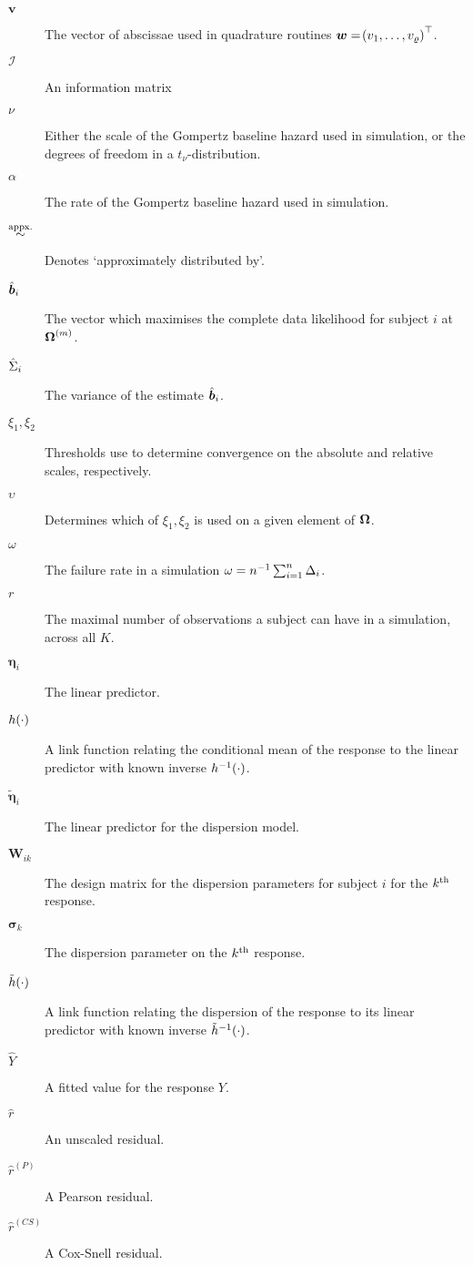 \begin{small}
\begin{multicols}{2}
\begin{description}
    \item[$\bm{v}$] The vector of abscissae used in quadrature routines $\bm{w}=\!\left( v_1,\dots,v_\varrho\right)^\top$.
    \item[$\mathcal{I}$] An information matrix
    \item[$\nu$] Either the scale of the Gompertz baseline hazard used in simulation, or the degrees of freedom in a $t_\nu$-distribution.
    \item[$\alpha$] The rate of the Gompertz baseline hazard used in simulation.
    \item[$\overset{\text{appx.}}{\sim}$] Denotes `approximately distributed by'.
    \item[$\hat{\bm{b}}_i$] The vector which maximises the complete data likelihood for subject $i$ at $\bm{\mathrm{\Omega}}^{(m)}$.
    \item[$\hat{\Sigma}_i$] The variance of the estimate $\hat{\bm{b}}_i$.
    \item[$\xi_1,\xi_2$] Thresholds use to determine convergence on the absolute and relative scales, respectively. 
    \item[$\upsilon$] Determines which of $\xi_1,\xi_2$ is used on a given element of $\bm{\mathrm{\Omega}}$. 
    \item[$\omega$] The failure rate in a simulation $\omega=n^{-1}\sum_{i=1}^n\Delta_i$. 
    \item[$r$] The maximal number of observations a subject can have in a simulation, across all $K$. 
    \item[$\bm{\eta}_i$] The linear predictor. 
    \item[$h\!\left(\cdot\right)$] A link function relating the conditional mean of the response to the linear predictor with known inverse $h^{-1}\!\left(\cdot\right)$. 
    \item[$\tilde{\bm{\eta}}_i$] The linear predictor for the dispersion model. 
    \item[$\bm{W}_{ik}$] The design matrix for the dispersion parameters for subject $i$ for the $k^{\text{th}}$ response. 
    \item[$\bm{\sigma}_k$] The dispersion parameter on the $k^{\text{th}}$ response. 
    \item[$\tilde{h}\!\left(\cdot\right)$] A link function relating the dispersion of the response to its linear predictor with known inverse $\tilde{h}^{-1}\!\left(\cdot\right)$. 
    \item[$\hat{Y}$] A fitted value for the response $Y$.
    \item[$\hat{r}$] An unscaled residual. 
    \item[$\hat{r}^{(P)}$] A Pearson residual. 
    \item[$\hat{r}^{(CS)}$] A Cox-Snell residual. 

\end{description}
\end{multicols}
\end{small}
